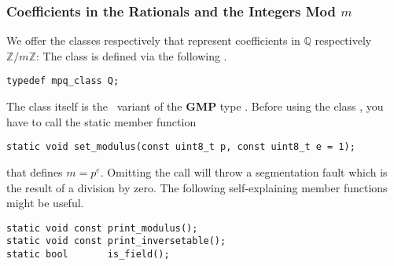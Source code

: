 \subsubsection{Coefficients in the Rationals and the Integers Mod \texorpdfstring{$m$}{m}}
\label{program:libhomology:CoefficientT:our_implementation}
We offer the classes  respectively  that represent coefficients in $\mathbb Q$ respectively $\mathbb Z / m \mathbb Z$:
The class  is defined via the following .
\begin{lstlisting}
typedef mpq_class Q;
\end{lstlisting}
The class  itself is the \cpp\ variant of the {\bfseries GMP} type .
Before using the class , you have to call the static member function
\begin{lstlisting}
static void set_modulus(const uint8_t p, const uint8_t e = 1);
\end{lstlisting}
that defines $m = p^e$.
Omitting the call will throw a segmentation fault which is the result of a division by zero.
The following self-explaining member functions might be useful.
\begin{lstlisting}
static void const print_modulus();    
static void const print_inversetable();
static bool       is_field();
\end{lstlisting}
